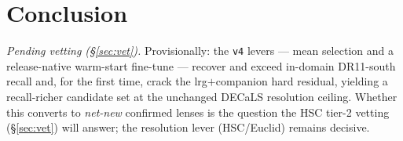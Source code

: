 \documentclass[11pt,letterpaper]{article}
\newcommand{\vc}{\texttt{v4}}
\begin{document}
\section{Conclusion}
\label{sec:conclusion}
\emph{Pending vetting (\S\ref{sec:vet}).} Provisionally: the \vc{} levers --- mean selection and a
release-native warm-start fine-tune --- recover and exceed in-domain DR11-south recall and, for the first
time, crack the lrg$+$companion hard residual, yielding a recall-richer candidate set at the unchanged
DECaLS resolution ceiling. Whether this converts to \emph{net-new} confirmed lenses is the question the
HSC tier-2 vetting (\S\ref{sec:vet}) will answer; the resolution lever (HSC/Euclid) remains decisive.



\end{document}
